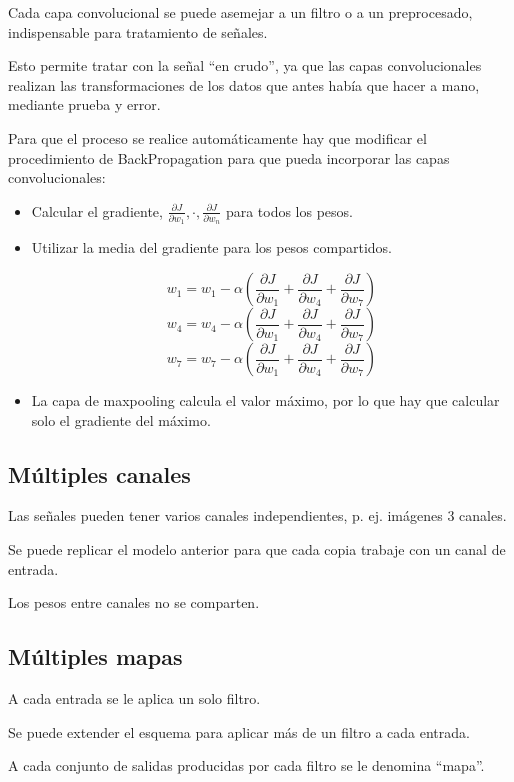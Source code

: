 \documentclass[12pt, twoside, openright]{report} %
\begin{document}
Cada capa convolucional se puede asemejar a un filtro o a un preprocesado, indispensable para tratamiento de señales.

Esto permite tratar con la señal “en crudo”, ya que las capas convolucionales realizan las transformaciones de los datos que antes había que hacer a mano, mediante prueba y error.

Para que el proceso se realice automáticamente hay que modificar el procedimiento de BackPropagation para que pueda incorporar las capas convolucionales:
\begin{itemize}
	\item Calcular el gradiente, $\frac{\partial J}{\partial w_1},\cdot, \frac{\partial J}{\partial w_n}$ para todos los pesos.
	\item Utilizar la media del gradiente para los pesos compartidos.
	
	$$w_1 = w_1 - \alpha (\frac{\partial J}{\partial w_1} + \frac{\partial J}{\partial w_4}+\frac{\partial J}{\partial w_7})$$
	$$w_4 = w_4 - \alpha (\frac{\partial J}{\partial w_1} + \frac{\partial J}{\partial w_4}+\frac{\partial J}{\partial w_7})$$
	$$w_7 = w_7 - \alpha (\frac{\partial J}{\partial w_1} + \frac{\partial J}{\partial w_4}+\frac{\partial J}{\partial w_7})$$

	\item La capa de maxpooling calcula el valor máximo, por lo que hay que calcular solo el gradiente del máximo.
\end{itemize}

\subsection{Múltiples canales}
Las señales pueden tener varios canales independientes, p. ej. imágenes 3 canales.

Se puede replicar el modelo anterior para que cada copia trabaje con un canal de entrada.

Los pesos entre canales no se comparten.

\subsection{Múltiples mapas}
A cada entrada se le aplica un solo filtro.

Se puede extender el esquema para aplicar más de un filtro a cada entrada.

A cada conjunto de salidas producidas por cada filtro se le denomina “mapa”.
\end{document}
